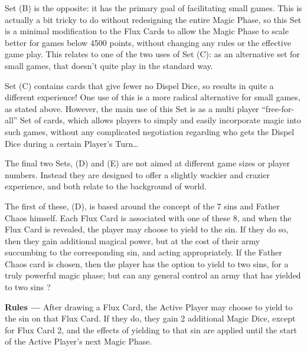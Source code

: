 
Set (B) is the opposite: it has the primary goal of facilitating small games. This is actually a bit tricky to do without redesigning the entire Magic Phase, so this Set is a minimal modification to the Flux Cards to allow the Magic Phase to scale better for games below 4500 points, without changing any rules or the effective game play. This relates to one of the two uses of Set (C): as an alternative set for small games, that doesn't quite play in the standard way.


Set (C) contains cards that give fewer  no Dispel Dice, so results in quite a different experience! One use of this is a more radical alternative for small games, as stated above. However, the main use of this Set is as a multi player \enquote{free-for-all} Set of cards, which allows players to simply and easily incorporate magic into such games, without any complicated negotiation regarding who gets the Dispel Dice during a certain Player's Turn\dots{}


The final two Sets, (D) and (E) are not aimed at different game sizes or player numbers. Instead they are designed to offer a slightly wackier and crazier experience, and both relate to the background of \theninthage{} world.

The first of these, (D), is based around the concept of the 7 sins and Father Chaos himself. Each Flux Card is associated with one of these 8, and when the Flux Card is revealed, the player may choose to yield to the sin. If they do so, then they gain additional magical power, but at the cost of their army succumbing to the corresponding sin, and acting appropriately. If the Father Chaos card is chosen, then the player has the option to yield to two sins, for a truly powerful magic phase; but can any general control an army that has yielded to two sins ?

\textbf{Rules ---} After drawing a Flux Card, the Active Player may choose to yield to the sin on that Flux Card. If
they do, they gain 2 additional Magic Dice, except for Flux Card 2, and the effects of yielding to that sin are
applied until the start of the Active Player's next Magic Phase.


